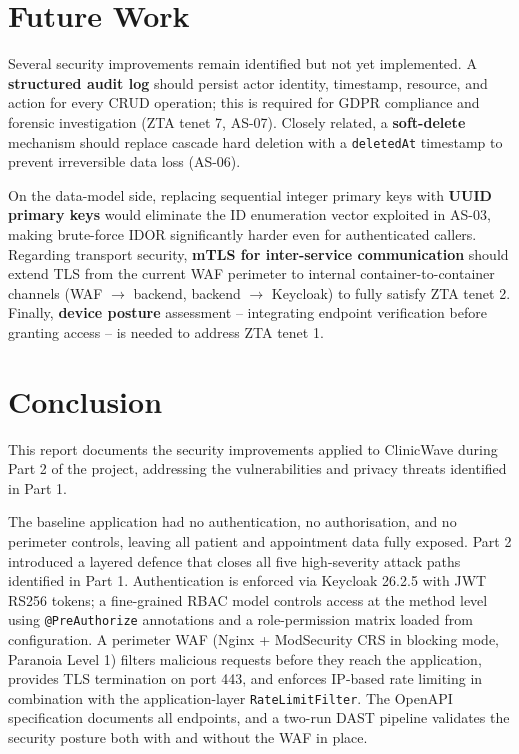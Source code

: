 \documentclass[12pt,a4paper]{report}
\begin{document}
\section{Future Work}

Several security improvements remain identified but not yet implemented.
A \textbf{structured audit log} should persist actor identity, timestamp, resource, and action
for every CRUD operation; this is required for GDPR compliance and forensic investigation
(ZTA tenet 7, AS-07). Closely related, a \textbf{soft-delete} mechanism should replace cascade
hard deletion with a \texttt{deletedAt} timestamp to prevent irreversible data loss (AS-06).

On the data-model side, replacing sequential integer primary keys with \textbf{UUID primary keys}
would eliminate the ID enumeration vector exploited in AS-03, making brute-force IDOR
significantly harder even for authenticated callers. Regarding transport security,
\textbf{mTLS for inter-service communication} should extend TLS from the current WAF perimeter
to internal container-to-container channels (WAF $\to$ backend, backend $\to$ Keycloak) to fully
satisfy ZTA tenet 2. Finally, \textbf{device posture} assessment -- integrating endpoint verification
before granting access -- is needed to address ZTA tenet 1.

\section{Conclusion}

This report documents the security improvements applied to ClinicWave during Part 2 of the
project, addressing the vulnerabilities and privacy threats identified in Part 1.

The baseline application had no authentication, no authorisation, and no perimeter controls,
leaving all patient and appointment data fully exposed. Part 2 introduced a layered defence
that closes all five high-severity attack paths identified in Part 1. Authentication is
enforced via Keycloak 26.2.5 with JWT RS256 tokens; a fine-grained RBAC model controls access
at the method level using \texttt{@PreAuthorize} annotations and a role-permission matrix
loaded from configuration. A perimeter WAF (Nginx + ModSecurity CRS in blocking mode, Paranoia
Level 1) filters malicious requests before they reach the application, provides TLS termination
on port 443, and enforces IP-based rate limiting in combination with the application-layer
\texttt{RateLimitFilter}. The OpenAPI specification documents all endpoints, and a two-run DAST
pipeline validates the security posture both with and without the WAF in place.
\end{document}
